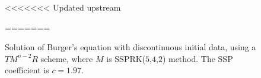 \begin{figure}[t!]
    \centering
<<<<<<< Updated upstream
    \caption{Solution of Burger's equation with discontinuous initial data, using a $ TM^{n-2}R $ scheme, where $ M $ is SSPRK($ 5 $,$ 4 $,$ 2 $) method. The SSP coefficient is $ c = 1.97 $.}
=======
    \subfloat[$\sigma = 1.97$]{\label{fig5.4a}%
}
\end{figure}

